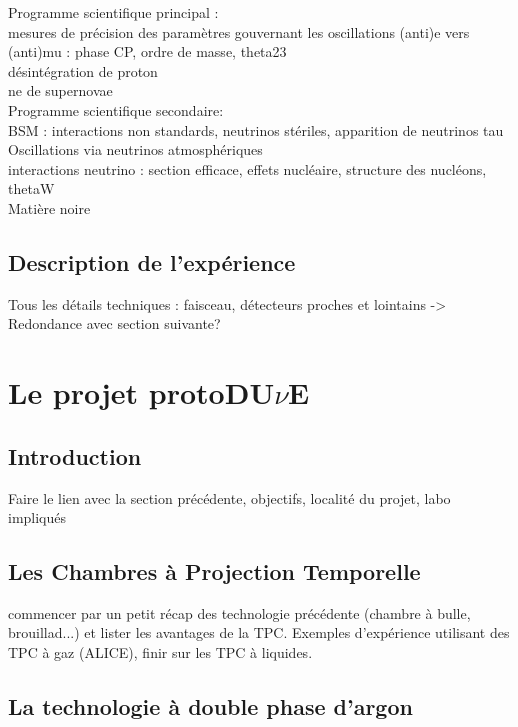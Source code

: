             Programme scientifique principal :\\ mesures de précision des paramètres gouvernant les oscillations (anti)e vers (anti)mu : phase CP, ordre de masse, theta23\\
            désintégration de proton\\
            ne de supernovae\\
            
            Programme scientifique secondaire:\\
            BSM : interactions non standards, neutrinos stériles, apparition de neutrinos tau\\
            Oscillations via neutrinos atmosphériques\\
            interactions neutrino : section efficace, effets nucléaire, structure des nucléons, thetaW\\
            Matière noire
            
        
        \subsection{Description de l'expérience}
            Tous les détails techniques : faisceau, détecteurs proches et lointains
            -> Redondance avec section suivante?
    
    \section{Le projet \texorpdfstring{protoDU$\nu$E}{protoDUNE}}
    
        \subsection{Introduction}
            Faire le lien avec la section précédente, objectifs, localité du projet, labo impliqués
    
        \subsection{Les Chambres à Projection Temporelle}
            commencer par un petit récap des technologie précédente (chambre à bulle, brouillad...) et lister les avantages de la TPC. Exemples d'expérience utilisant des TPC à gaz (ALICE), finir sur les TPC à liquides.
        
        \subsection{La technologie à double phase d'argon}
